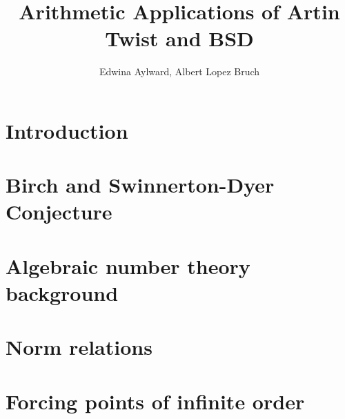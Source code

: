 \documentclass{article}
\title{Arithmetic Applications of Artin Twist and BSD}
\author{Edwina Aylward, Albert Lopez Bruch}
\theoremstyle{plain}
\theoremstyle{definition}
\begin{document}
	\maketitle
	\newpage
	\tableofcontents
	\newpage

\section*{Introduction}


\newpage
\section{Birch and Swinnerton-Dyer Conjecture}


\newpage
\section{Algebraic number theory background}




\newpage
\section{Norm relations}



\newpage
\section{Forcing points of infinite order}



\newpage



\end{document}
